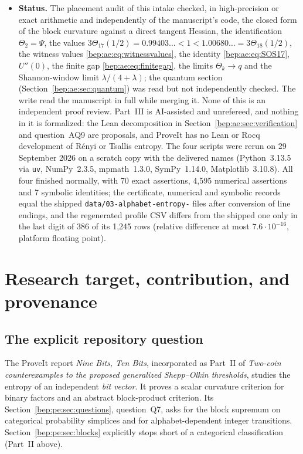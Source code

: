 \documentclass[11pt]{article}
\numberwithin{equation}{section}
\theoremstyle{definition}
\theoremstyle{remark}
\begin{document}
\begin{itemize}
(Section~\ref{bep:ae:sec:intro}); its three citations of the repository
report became ``(Part~II above)'', ``Part~II
(Theorem~\ref{bep:pe:thm:blocks})'' and ``(Part~II,
Theorems~\ref{bep:pe:thm:renyi} and~\ref{bep:pe:thm:tsallisabove})''; the
two renamings above; the macro for the pinned commit and the repository
path were written out; and its questions' labels Q1--Q9 became
AQ1--AQ9. No mathematical statement of the manuscript or of Parts~I--II
was changed, and nothing of the manuscript was omitted.
\item \textbf{Status.} The placement audit of this intake checked, in
high-precision or exact arithmetic and independently of the manuscript's
code, the closed form of the block curvature against a direct tangent
Hessian, the identification $\Theta_2=\Psi$, the values
$3\Theta_{17}(1/2)=0.99403\ldots<1<1.00680\ldots=3\Theta_{18}(1/2)$, the
witness values
\eqref{bep:ae:eq:witnessvalues}, the identity \eqref{bep:ae:eq:SOS17},
$U''(0)$, the finite gap \eqref{bep:ae:eq:finitegap}, the limits
$\Theta_k\to q$ and the Shannon-window limit $\lambda/(4+\lambda)$; the
quantum section (Section~\ref{bep:ae:sec:quantum}) was read but not
independently checked. The write read the manuscript in full while
merging it. None of this is an independent proof review. Part~III is AI-assisted and unrefereed, and nothing in it
is formalized: the Lean decomposition in
Section~\ref{bep:ae:sec:verification} and question~AQ9 are proposals,
and ProveIt has no Lean or Rocq development of R\'enyi or Tsallis
entropy. The four scripts were rerun on 29 September 2026 on a scratch
copy with the delivered names (Python~3.13.5 via \texttt{uv}, NumPy~2.3.5,
mpmath~1.3.0, SymPy~1.14.0, Matplotlib~3.10.8). All four finished
normally, with 70 exact assertions, 4,595 numerical assertions and 7
symbolic identities; the certificate, numerical and symbolic records
equal the shipped \texttt{data/03-alphabet-entropy-} files after
conversion of line endings, and the regenerated profile CSV differs from
the shipped one only in the last digit of 386 of its 1,245 rows (relative
difference at most $7.6\cdot10^{-16}$, platform floating point).
\end{itemize}

\section{Research target, contribution, and provenance}\label{bep:ae:sec:intro}

\subsection{The explicit repository question}
The ProveIt report \emph{Nine Bits, Ten Bits}, incorporated as Part~II of
\emph{Two-coin counterexamples to the proposed generalized Shepp--Olkin
thresholds}, studies the entropy of an independent \emph{bit vector}.
It proves a scalar curvature criterion for binary factors and an abstract
block-product criterion. Its Section~\ref{bep:pe:sec:questions},
question~Q7, asks for the block supremum on categorical probability
simplices and for alphabet-dependent integer transitions.
Section~\ref{bep:pe:sec:blocks} explicitly stops short of a categorical
classification (Part~II above).
\end{document}
